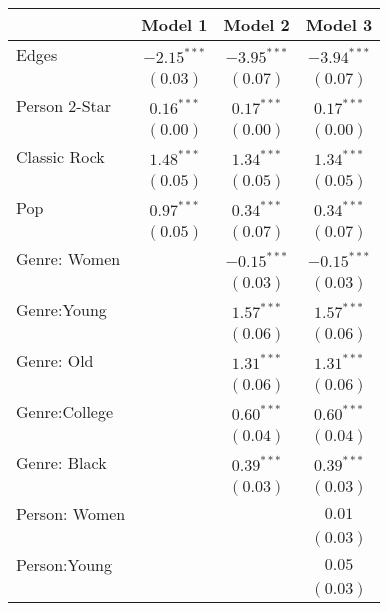
\usepackage{booktabs}

\begin{table}
\begin{center}
\begin{tabular}{l c c c}
\toprule
 & Model 1 & Model 2 & Model 3 \\
\midrule
Edges          & $-2.15^{***}$ & $-3.95^{***}$ & $-3.94^{***}$ \\
               & $(0.03)$      & $(0.07)$      & $(0.07)$      \\
Person 2-Star  & $0.16^{***}$  & $0.17^{***}$  & $0.17^{***}$  \\
               & $(0.00)$      & $(0.00)$      & $(0.00)$      \\
Classic Rock   & $1.48^{***}$  & $1.34^{***}$  & $1.34^{***}$  \\
               & $(0.05)$      & $(0.05)$      & $(0.05)$      \\
Pop            & $0.97^{***}$  & $0.34^{***}$  & $0.34^{***}$  \\
               & $(0.05)$      & $(0.07)$      & $(0.07)$      \\
Genre: Women   &               & $-0.15^{***}$ & $-0.15^{***}$ \\
               &               & $(0.03)$      & $(0.03)$      \\
Genre:Young    &               & $1.57^{***}$  & $1.57^{***}$  \\
               &               & $(0.06)$      & $(0.06)$      \\
Genre: Old     &               & $1.31^{***}$  & $1.31^{***}$  \\
               &               & $(0.06)$      & $(0.06)$      \\
Genre:College  &               & $0.60^{***}$  & $0.60^{***}$  \\
               &               & $(0.04)$      & $(0.04)$      \\
Genre: Black   &               & $0.39^{***}$  & $0.39^{***}$  \\
               &               & $(0.03)$      & $(0.03)$      \\
Person: Women  &               &               & $0.01$        \\
               &               &               & $(0.03)$      \\
Person:Young   &               &               & $0.05$        \\
               &               &               & $(0.03)$      \\

\end{tabular}
\end{center}
\end{table}
